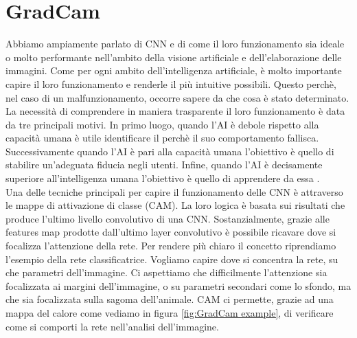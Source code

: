 \section{GradCam}
Abbiamo ampiamente parlato di CNN e di come il loro funzionamento sia ideale o molto performante nell'ambito della visione artificiale e dell'elaborazione delle immagini. Come per ogni ambito dell'intelligenza artificiale, è molto importante capire il loro funzionamento e renderle il più intuitive possibili. Questo perchè, nel caso di un malfunzionamento, occorre sapere da che cosa è stato determinato. La necessità di comprendere in maniera trasparente il loro funzionamento è data da tre principali motivi. In primo luogo, quando l'AI è debole rispetto alla capacità umana è utile identificare il perchè il suo comportamento fallisca. Successivamente quando l'AI è pari alla capacità umana l'obiettivo è quello di stabilire un'adeguata fiducia negli utenti. Infine, quando l'AI è decisamente superiore all'intelligenza umana l'obiettivo è quello di apprendere da essa \cite{Selvaraju_2017_ICCV}.
\\Una delle tecniche principali per capire il funzionamento delle CNN è attraverso le mappe di attivazione di classe (CAM). La loro logica è basata sui risultati che produce l'ultimo livello convolutivo di una CNN. Sostanzialmente, grazie alle features map prodotte dall'ultimo layer convolutivo è possibile ricavare dove si focalizza l'attenzione della rete. Per rendere più chiaro il concetto riprendiamo l'esempio della rete classificatrice. Vogliamo capire dove si concentra la rete, su che parametri dell'immagine. Ci aspettiamo che difficilmente l'attenzione sia focalizzata ai margini dell'immagine, o su parametri secondari come lo sfondo, ma che sia focalizzata sulla sagoma dell'animale. CAM ci permette, grazie ad una mappa del calore come vediamo in figura \ref{fig:GradCam example}, di verificare come si comporti la rete nell'analisi dell'immagine.

